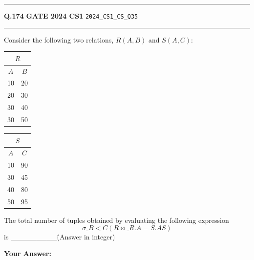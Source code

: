 \documentclass[a4paper,10pt]{article}
\begin{document}
\vspace{6pt}\hrule height 0.35pt\vspace{6pt}
\noindent
\begin{tcolorbox}[
    blanker,
    sidebyside,
    sidebyside align=top,
    lefthand width=0.55\textwidth,
    top=4pt, bottom=4pt, left=0pt, right=0pt,
    middle=16pt,
    underlay={
        \draw[dashed, black!80, line width=0.8pt, dash pattern=on 4pt off 3pt]
            ([xshift=0.55\textwidth+8pt]frame.north west) --
            ([xshift=0.55\textwidth+8pt]frame.south west);
    }
]
\textbf{Q.174}  \hfill {\footnotesize\textbf{GATE 2024 CS1} \quad \tiny\texttt{2024\_CS1\_CS\_Q35}}
\vspace{2pt}\hrule height 0.3pt\vspace{4pt}

Consider the following two relations, $R(A,B)$ and $S(A,C)$:
\begin{center}
\begin{tabular}{|c|c|}
\multicolumn{2}{c}{$R$} \\
\hline
$A$ & $B$ \\
\hline
10 & 20 \\
20 & 30 \\
30 & 40 \\
30 & 50 \\
\hline
\end{tabular}
\qquad
\begin{tabular}{|c|c|}
\multicolumn{2}{c}{$S$} \\
\hline
$A$ & $C$ \\
\hline
10 & 90 \\
30 & 45 \\
40 & 80 \\
50 & 95 \\
\hline
\end{tabular}
\end{center}
The total number of tuples obtained by evaluating the following expression
\[ \sigma\_{B < C}(R \bowtie\_{R.A = S.A} S) \]
is \_\_\_\_\_\_\_\_\_\. (Answer in integer)

\par\vspace{6pt}\noindent\textbf{Your Answer:} \fbox{\rule{0pt}{1.3ex}\hspace{3cm}}

\tcblower


\end{tcolorbox}
\end{document}
